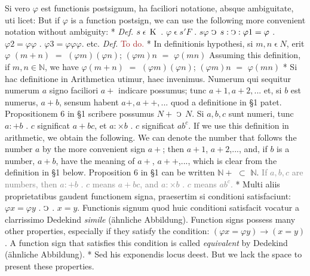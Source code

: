 \documentclass{book}
\newcommand{\C}{\mathop{\sbox0{$\displaystyle$$\reflectbox{C}$} %
\raisebox{-\height+\ht0-0.05cm}[\ht0][\dp0]{\scalebox{0.8}[0.8]{\copy0}}}\displaylimits} %
\newcommand{\smallIn}{\ensuremath{\mathrel{\epsilon}}}
\newcommand{\K}{\mathop{\thinspace \text{K} \thinspace}}
\newcommand\irrelavent[1]{\textcolor{gray}{#1}}
\newcommand\todo{\textcolor{brown}{To do.}}
\newenvironment{translateTwoCol}
               { %
                 \columnratio{0.5, 0.5} \begin{paracol}{2}
                 \newcommand{\LAT}{\switchcolumn[0]*}
                 \newcommand{\ENG}{\switchcolumn[1]}
               }
               { %
                 \let\ENG\undefined
                 \let\LAT\undefined
                 \end{paracol}
               }
\begin{document}
\begin{translateTwoCol}
Si vero $\varphi$ est functionis postsignum, ha faciliori notatione, absque ambiguitate, uti licet:
\ENG
But if $\varphi$ is a function postsign, we can use the following more convenient notation without ambiguity:
\LAT
\emph{Def.} \hspace{0.25cm} $s \smallIn \K$ . $\varphi \smallIn s 'F$ . $s \varphi$ $\C$ $s : \C : \varphi 1 = \varphi$ . $\varphi 2 = \varphi \varphi$ . $\varphi 3 = \varphi \varphi \varphi$. etc.
\ENG
\emph{Def.} \hspace{0.25cm} \todo
\LAT
In definitionis hypothesi, si $m, n \smallIn N$, erit $\varphi$ $(m+n)$ $=$ $(\varphi m)(\varphi n)$; $(\varphi m)n$ $=$ $\varphi (m n)$
\ENG
Assuming this definition, if $m, n \in \mathbb{N}$, we have $\varphi(m+n)$ $=$ $(\varphi m)(\varphi n)$; $(\varphi m)n$ $=$ $\varphi (m n)$
\LAT
Si hac definitione in Arithmetica utimur, haec invenimus. Numerum qui sequitur numerum $a$ signo faciliori $a +$ indicare possumus; tunc $a + 1, a+2,...$ et, si $b$ est numerus, $a + b$, sensum habent $a +, a + +,...$ quod a definitione in \S 1 patet. Propositionem 6 in \S 1 scribere possumus $N +$ $\C$ $N$. Si $a, b, c$ sunt numeri, tunc $a : + b$ . $c$ significat $a + b c$, et $a : \times b$ . $c$ significat $a b^c$.
\ENG
If we use this definition in arithmetic, we obtain the following. We can denote the number that follows the number $a$ by the more convenient sign $a+$; then $a + 1$, $a + 2$,..., and, if $b$ is a number, $a + b$, have the meaning of $a +$, $a ++$,..., which is clear from the definition in \S 1 below. Proposition 6 in \S 1 can be written $\mathbb{N} +$ $\subset$ $\mathbb{N}$. \irrelavent{If $a, b, c$ are numbers, then $a : + b$ . $c$ means $a + b c$, and $a : \times b$ . $c$ means $a b^c$.}
\LAT
Multi aliis proprietatibus gaudent functionem signa, praesertim si conditioni satisfaciunt: $\varphi x = \varphi y$ . $\C$ . $x = y$. Functionis signum quod huic conditioni satisfacit vocatur a clarrissimo Dedekind \emph{simile} (\"ahnliche Abbildung).
\ENG
Function signs possess many other properties, especially if they satisfy the condition: $(\varphi x = \varphi y) \rightarrow (x = y)$. A function sign that satisfies this condition is called \emph{equivalent} by Dedekind (\"ahnliche Abbildung).
\LAT
Sed his exponendis locus deest.
\ENG
But we lack the space to present these properties.
\end{translateTwoCol}
\end{document}
